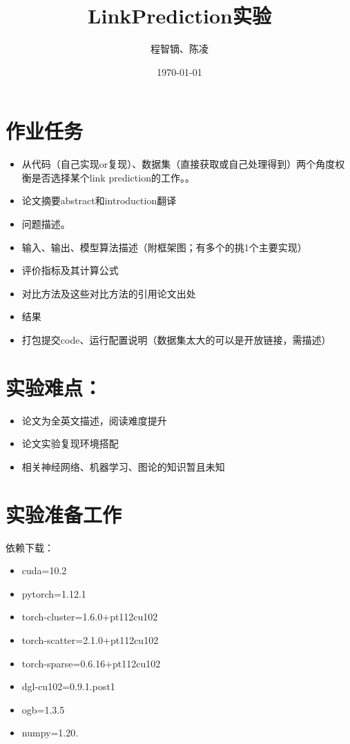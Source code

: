 \documentclass{article}
\title{LinkPrediction实验}
\author{程智镝、陈凌}
\date{\today}
\begin{document}
\maketitle

\section*{作业任务}
\begin{itemize}
    \item 从代码（自己实现or复现）、数据集（直接获取或自己处理得到）两个角度权衡是否选择某个link prediction的工作。。
    \item 论文摘要abstract和introduction翻译
    \item 问题描述。
    \item 输入、输出、模型算法描述（附框架图；有多个的挑1个主要实现）
    \item 评价指标及其计算公式
    \item 对比方法及这些对比方法的引用论文出处
    \item 结果
    \item 打包提交code、运行配置说明（数据集太大的可以是开放链接，需描述）
\end{itemize}
\section*{实验难点：}
\begin{itemize}
    \item 论文为全英文描述，阅读难度提升
    \item 论文实验复现环境搭配
    \item 相关神经网络、机器学习、图论的知识暂且未知
\end{itemize}
\section*{实验准备工作}
依赖下载：
\begin{itemize}
\item cuda=10.2
\item pytorch=1.12.1
\item torch-cluster=1.6.0+pt112cu102
\item torch-scatter=2.1.0+pt112cu102
\item torch-sparse=0.6.16+pt112cu102
\item dgl-cu102=0.9.1.post1
\item ogb=1.3.5
\item numpy=1.20.
\end{itemize}
\end{document}
